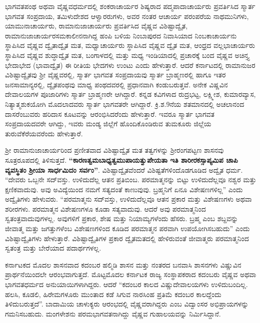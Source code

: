 ಭಾಗವತಪಂಥ ಅಥವಾ ವೈಷ್ಣವಧರ್ಮದಲ್ಲಿ ಶಂಕರಾಚಾರ್ಯರ ಶಿಷ್ಯರಾದ ಪದ್ಮಪಾದಾಚಾರ್ಯರು ಪ್ರವರ್ತಿಸಿದ ಸ್ಮಾರ್ತ ಭಾಗವತ ಸಂಪ್ರದಾಯ, ತಮಿಳುದೇಶದ ಆಳ್ವಾರರುಗಳು, ಅವರ ನಂತರ ಆಚಾರ್ಯ ಪರಂಪರೆಯ ನಾಥಮುನಿಗಳು, ಯಾಮುನಾಚಾರ್ಯರು, ರಾಮಾನುಜಾಚಾರ್ಯರು ಪ್ರವರ್ತಿಸಿದ ವೈಷ್ಣವ ವಿಶಿಷ್ಟಾದ್ವೈತ, ರಾಮಾನುಜಾಚಾರ್ಯರ\break ಸಮಕಾಲೀನನಾಗಿದ್ದ ಹಂಪಿ ಬಳಿಯ ನಿಂಬಾಪುರದ ನಿವಾಸಿಯಾದ ನಿಂಬಕಾಚಾರ್ಯನು ಸ್ಥಾಪಿಸಿದ ವೈಷ್ಣವ ದ್ವೈತಾದ್ವೈತ ಮತ, ಮಧ್ವಾಚಾರ್ಯರು ಸ್ಥಾಪಿಸಿದ ವೈಷ್ಣವ ದ್ವೈತ ಮತ, ಆಂಧ್ರದ ವಲ್ಲಭಾಚಾರ್ಯರು ಸ್ಥಾಪಿಸಿದ ವೈಷ್ಣವ ಶುದ್ಧಾದ್ವೈತ ಮತ, ಬಂಗಾಳದಲ್ಲಿ ಮತ್ತು ಮಧ್ಯ ಇಂಡಿಯಾದಲ್ಲಿ ಪ್ರಚಾರಕ್ಕೆ ಬಂದ ವೈಷ್ಣವ ಅಚಿನ್ತ್ಯ ಭೇದಾಭೇದ (ಭಾವಾದ್ವೈತ) ಈ ರೀತಿಯ ಭೇದಗಳು ಉಂಟು ಎಂದು ಹೇಳುತ್ತಾರೆ. ಆದರೆ ಕರ್ನಾಟದಲ್ಲಿ ರಾಮಾನುಜರ ವಿಶಿಷ್ಟಾದ್ವೈತವು ಶ‍್ರೀ ವೈಷ್ಣವರಲ್ಲಿ, ಸ್ಮಾರ್ತ ಭಾಗವತ ಸಂಪ್ರದಾಯವು ಸ್ಮಾರ್ತ ಬ್ರಾಹ್ಮಣರಲ್ಲಿ ಹಾಗೂ ಇತರ ಜನಸಾಮಾನ್ಯರಲ್ಲಿ, ದ್ವೈತಪಂಥವು ಮಾಧ್ವ ಪಂಥದವರಲ್ಲಿ ಪ್ರಧಾನವಾಗಿ ಕಂಡುಬರುತ್ತವೆ. ಅನೇಕ ವಿಷ್ಣವಿನ ದೇವಾಲಯಗಳ ಪೂಜಾರಿಗಳು ಸ್ಮಾರ್ತ ಬ್ರಾಹ್ಮಣರೇ ಆಗಿದ್ದಾರೆ. ಕನ್ನಡ ಕವಿಗಳಾದ ರುದ್ರಭಟ್ಟ, ಲಕ್ಷ್ಮೀಶ, ಕುಮಾರವ್ಯಾಸ, ನಿತ್ಯಾತ್ಮಶುಕಯೋಗಿ ಮೊದಲಾದವರು ಸ್ಮಾರ್ತ ಭಾಗವತರೇ ಆಗಿದ್ದಾರೆ. ಕ್ರಿ.ಶ.9ನೆಯ ಶತಮಾನದಲ್ಲಿ ಅಚಲಾನಂದ ದಾಸರೆಂಬುವರು ಹರಿದಾಸ ಕೂಟವನ್ನು ಆರಂಭಿಸಿದರೆಂದು ಹೇಳುತ್ತಾರೆ. ಇವರೂ ಸ್ಮಾರ್ತ ಭಾಗವತ ಸಂಪ್ರದಾಯದವರೇ ಆಗಿದ್ದು, ಇವರು ಮಂಡ್ಯ ಜಿಲ್ಲೆಗೆ ಹೊಂದಿಕೊಂಡಿರುವ ತುಮಕೂರು ಜಿಲ್ಲೆಯ ತುರುವೆಕೆರೆಯವರೆಂದು ಹೇಳುತ್ತಾರೆ.

ಶ‍್ರೀ ರಾಮಾನುಜಾಚಾರ್ಯರಿಂದ ಪ್ರಣೀತವಾದ ವಿಶಿಷ್ಟಾದ್ವೈತ ಮತ ತತ್ವಗಳನ್ನು ಶ‍್ರೀರಂಗಪಟ್ಟಣ ಶಾಸನವು ಸೂತ್ರರೂಪದಲ್ಲಿ ತಿಳಿಸುತ್ತದೆ. \textbf{“ಕಾರಣತ್ವಮಬಾಧ್ಯತ್ವಮುಪಾಯತ್ವುಪೇಯತಾ ಇತಿ ಶಾರೀರಕಸ್ಸಾಪ್ಯಮಿಪ ಚಾಪಿ ವ್ಯವಸ್ಥಿತಂ ಶ‍್ರೀಯಾ ಸಾರ್ಧಮಿದಂ ಸರ್ವಂ”}. ವಿಶಿಷ್ಟಾದ್ವೈತವೆಂದರೆ ವಿಶಿಷ್ಟತೆಗಳಿಂದೊಡಗೂಡಿದ ಅದ್ವೈತ ಧರ್ಮ. “ದೇವರು ಒಬ್ಬನೇ ಸದ್​ವಸ್ತು. ಉಳಿದುದೆಲ್ಲ ಆತನ ಪ್ರತಿಬಿಂಬ. ಪರಮಾತ್ಮನನ್ನು ಬಿಟ್ಟು ಉಳಿದುದೆಲ್ಲವೂ ನಶ್ವರ ಮತ್ತು ಕ್ಷಣಿಕವಾದುವು. ಅವು ಅವಿದ್ಯೆಯಿಂದ ನಮಗೆ ಸತ್ಯದಂತೆ ಕಾಣುವುವು. ಬ್ರಹ್ಮನಿಗೆ ಏನೂ ವಿಶೇಷಣಗಳಿಲ್ಲ” ಎಂದು ಅದ್ವೈತಿಗಳು ಹೇಳುವರು. “ಪರಮಾತ್ಮನು ಸದ್​ವಸ್ತು, ಉಳಿದುದೆಲ್ಲವೂ ಆತನ ಪ್ರಕಾರ ಮತ್ತು ವಿಶೇಷಣಗಳು ಅಥವಾ ಶರೀರಗಳು. ಪರಮಾತ್ಮನ ವಿಶೇಷಣಗಳೂ ಕೂಡಾ ಸತ್ಯವಾದುವು. ಆದರೆ ಅವು ಪರಮಾತ್ಮನಿಂದ ಸ್ವತಂತ್ರವಾದುವುಗಳಲ್ಲ. ಅವುಗಳಿಗೆ ಪ್ರಕಾರ, ಶೇಷ ಮತ್ತು ನಿಯಾಮ್ಯಗಳೆಂದು ಹೆಸರು. ಬ್ರಹ್ಮ ಎಂಬ ಶಬ್ದವನ್ನು ಜೀವಾತ್ಮ ಮತ್ತು ಜಗತ್ತುಗಳೆಂಬ ವಿಶೇಷಣಗಳಿಂದ ಕೂಡಿದ ಪರಮಾತ್ಮನ ಪರವಾಗಿ ಉಪಯೋಗಿಸಬಹುದು” ಎಂದು ವಿಶಿಷ್ಟಾದ್ವೈತಿಗಳು ಹೇಳುತ್ತಾರೆ. ವಿಶಿಷ್ಟಾದ್ವೈತಿಗಳ ಪ್ರಕಾರ ದ್ವೈತಮತದಲ್ಲಿ ಹೇಳಿರುವಂತೆ ಜೀವಾತ್ಮರು ಪರಮಾತ್ಮನಿಂದ ಸ್ವತಂತ್ರ ಮತ್ತು ಬೇರೆಯಾದ ಪದಾರ್ಥಗಳಲ್ಲ.

ಕರ್ನಾಟಕದ ಮೊದಲ ಶಾಸನವಾದ ಕದಂಬರ ಹಲ್ಮಿಡಿ ಶಾಸನ ಮತ್ತು ನಂತರದ ಬನವಾಸಿ ಶಾಸನಗಳು ವಿಷ್ಣುವಿನ ಪ್ರಾರ್ಥನೆಯಿಂದಲೇ ಆರಂಭವಾಗುತ್ತದೆ. ಮೊಟ್ಟಮೊದಲ ಕರ್ನಾಟಕ ರಾಜ್ಯ ಸಂಸ್ಥಾಪಕರಾದ ಕದಂಬರು ವೈಷ್ಣವ ಅಥವಾ ಭಾಗವತಧರ್ಮದ ಅನುಯಾಯಿಗಳಾಗಿದ್ದರು. ಆದರೆ “ಕದಂಬರ ಕಾಲದ ವಿಷ್ಣುದೇವಾಲಯಗಳು ಉಳಿದುಬಂದಿಲ್ಲ. ಹಲಸಿ, ಕೂಡಲಿ, ಹಿರೇಮಗಳೂರು ಮುಂತಾದ ಕಡೆ ಸಿಗುವ ನಾರಸಿಂಹ ಪ್ರತಿಮೆ ಕದಂಬರ ಕಾಲದ್ದೆಂದು ತಿಳಿದುಬರುತ್ತದೆ”. ಬಾದಾಮಿಯ ಚಾಳುಕ್ಯರು ಆರಂಭದಲ್ಲಿ ವೈಷ್ಣವರಾಗಿದ್ದರು ಎಂಬ ವಿದ್ವಾಂಸರ ಅಭಿಪ್ರಾಯಗಳನ್ನು ಗಮನಿಸಬಹುದು. ಮಂಗಳೇಶನು ಪರಮಭಾಗವತನಾಗಿದ್ದು ವೈಷ್ಣವ ಗುಹಾಲಯವನ್ನು ನಿರ್ಮಿಸಿದ್ದಾನೆ.


